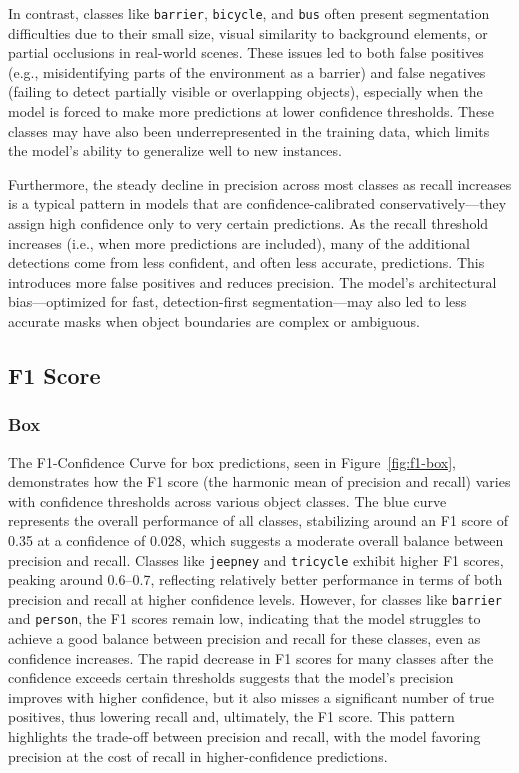 In contrast, classes like \texttt{barrier}, \texttt{bicycle}, and \texttt{bus} often present segmentation difficulties due to their small size, visual similarity to background elements, or partial occlusions in real-world scenes. These issues led to both false positives (e.g., misidentifying parts of the environment as a barrier) and false negatives (failing to detect partially visible or overlapping objects), especially when the model is forced to make more predictions at lower confidence thresholds. These classes may have also been underrepresented in the training data, which limits the model's ability to generalize well to new instances.

Furthermore, the steady decline in precision across most classes as recall increases is a typical pattern in models that are confidence-calibrated conservatively—they assign high confidence only to very certain predictions. As the recall threshold increases (i.e., when more predictions are included), many of the additional detections come from less confident, and often less accurate, predictions. This introduces more false positives and reduces precision. The model's architectural bias—optimized for fast, detection-first segmentation—may also led to less accurate masks when object boundaries are complex or ambiguous.

\subsection{F1 Score}

\subsubsection{Box}
The F1-Confidence Curve for box predictions, seen in Figure~\ref{fig:f1-box}, demonstrates how the F1 score (the harmonic mean of precision and recall) varies with confidence thresholds across various object classes. The blue curve represents the overall performance of all classes, stabilizing around an F1 score of 0.35 at a confidence of 0.028, which suggests a moderate overall balance between precision and recall. Classes like \texttt{jeepney} and \texttt{tricycle} exhibit higher F1 scores, peaking around 0.6–0.7, reflecting relatively better performance in terms of both precision and recall at higher confidence levels. However, for classes like \texttt{barrier} and \texttt{person}, the F1 scores remain low, indicating that the model struggles to achieve a good balance between precision and recall for these classes, even as confidence increases. The rapid decrease in F1 scores for many classes after the confidence exceeds certain thresholds suggests that the model's precision improves with higher confidence, but it also misses a significant number of true positives, thus lowering recall and, ultimately, the F1 score. This pattern highlights the trade-off between precision and recall, with the model favoring precision at the cost of recall in higher-confidence predictions.

